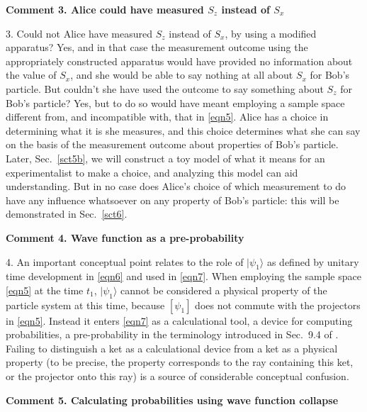 \documentclass[12pt]{article} %
\def\outl#1{\par{\medskip\noindent\hspace*{.5cm}\bf
      \mathversion{bold}#1\mathversion{normal}\smallskip} }
\def\np{} \def\xa{} \def\xb{} \def\xn{} \def\xp{}
\def\outl#1{} \def\np{} \def\xa{} \def\xb{} \def\xn{} \def\xp{}
\def\outl#1{\par{\medskip\noindent\hspace*{.5cm}\bf
      \mathversion{bold}#1\mathversion{normal}\smallskip} }
\def\np{\newpage }\def\xn{\nopagebreak }\def\xp{\pagebreak }
\newcommand{\ket}[1]{|#1\rgl }
\newcommand{\rgl}{\rangle }
\begin{document}
\xb
\outl{Comment 3.  Alice could have measured $S_z$ instead of $S_x$}
\xa




3. Could not Alice have measured $S_z$ instead of $S_x$, by using a modified
apparatus?  Yes, and in that case the measurement outcome using the
appropriately constructed apparatus would have provided no information about
the value of $S_x$, and she would be able to say nothing at all about $S_x$
for Bob's particle.  But couldn't she have used the outcome to say something
about $S_z$ for Bob's particle?  Yes, but to do so would have meant employing
a sample space different from, and incompatible with, that in \eqref{eqn5}.
Alice has a choice in determining what it is she measures, and this choice
determines what she can say on the basis of the measurement outcome about
properties of Bob's particle.  Later, Sec.~\ref{sct5b}, we will construct a
toy model of what it means for an experimentalist to make a choice, and
analyzing this model can aid understanding.  But in no case does Alice's
choice of which measurement to do have any influence whatsoever on any
property of Bob's particle: this will be demonstrated in Sec.~\ref{sct6}.

\xb
\outl{Comment 4. Wave function as a pre-probability}
\xa



4. An important conceptual point relates to the role of $\ket{\psi_1}$ as
defined by unitary time development in \eqref{eqn6} and used in \eqref{eqn7}.
When employing the sample space \eqref{eqn5} at the time $t_1$, $\ket{\psi_1}$
cannot be considered a physical property of the particle system at this time,
because $[\psi_1]$ does not commute with the projectors in \eqref{eqn5}.
Instead it enters \eqref{eqn7} as a calculational tool, a device for computing
probabilities, a pre-probability in the terminology introduced in Sec.~9.4 of
\cite{Grff02c}.  Failing to distinguish a ket as a calculational device from a
ket as a physical property (to be precise, the property corresponds to the ray
containing this ket, or the projector onto this ray) is a source of
considerable conceptual confusion.

\xb
\outl{Comment 5. Calculating probabilities using wave function collapse}
\xa
\end{document}
